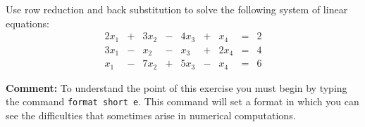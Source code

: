 \begin{exercise} \label{c2.3.3}
Use row reduction and back substitution to solve the following
system of linear equations:
\[
\begin{array}{rcrcrcrcr}
2x_1 & + &  3x_2 &  - &  4x_3 & + &  x_4 &  = & 2 \\
3x_1 & - &   x_2 &  - &   x_3 & + & 2x_4 &  = & 4 \\
 x_1 & - &  7x_2 &  + &  5x_3 & - &  x_4 &  = & 6
\end{array}
\]
\end{exercise}


\begin{exercise} \label{c2.3.4}
{\bf Comment:} {\rm To understand the point of this exercise you
must begin by typing the \Matlab command {\tt format short e}.
This command will set a format in which you can see the
difficulties that sometimes arise in numerical computations.}


\end{exercise}

